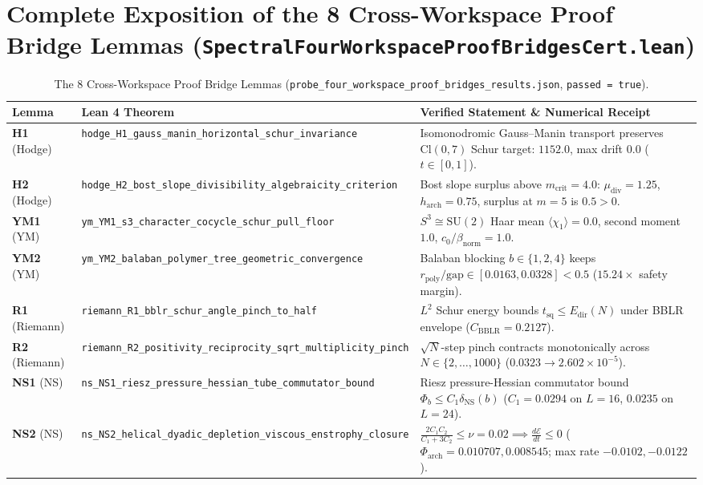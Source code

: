 \documentclass[11pt,a4paper]{article}
\begin{document}
\section{Complete Exposition of the 8 Cross-Workspace Proof Bridge Lemmas (\texttt{SpectralFourWorkspaceProofBridgesCert.lean})}

\begin{table}[htbp]
\centering
\caption{The 8 Cross-Workspace Proof Bridge Lemmas (\texttt{probe\_four\_workspace\_proof\_bridges\_results.json}, \texttt{passed = true}).}
\label{tab:bridges}
\footnotesize
\begin{tabular}{@{}>{\raggedright\arraybackslash}p{2.2cm}>{\raggedright\arraybackslash}p{4.8cm}>{\raggedright\arraybackslash}p{6.5cm}@{}}
\toprule
Lemma & Lean 4 Theorem & Verified Statement \& Numerical Receipt \\
\midrule
\textbf{H1} (Hodge) & \texttt{hodge\_H1\_gauss\_manin\_horizontal\_schur\_invariance} & Isomonodromic Gauss--Manin transport preserves $\mathrm{Cl}(0,7)$ Schur target: $1152.0$, max drift $0.0$ ($t\in[0,1]$). \\
\textbf{H2} (Hodge) & \texttt{hodge\_H2\_bost\_slope\_divisibility\_algebraicity\_criterion} & Bost slope surplus above $m_{\mathrm{crit}} = 4.0$: $\mu_{\mathrm{div}} = 1.25$, $h_{\mathrm{arch}} = 0.75$, surplus at $m=5$ is $0.5 > 0$. \\
\textbf{YM1} (YM) & \texttt{ym\_YM1\_s3\_character\_cocycle\_schur\_pull\_floor} & $S^3 \cong \mathrm{SU}(2)$ Haar mean $\langle\chi_1\rangle = 0.0$, second moment $1.0$, $c_0/\beta_{\mathrm{norm}} = 1.0$. \\
\textbf{YM2} (YM) & \texttt{ym\_YM2\_balaban\_polymer\_tree\_geometric\_convergence} & Balaban blocking $b\in\{1,2,4\}$ keeps $r_{\mathrm{poly}}/\mathrm{gap} \in [0.0163, 0.0328] < 0.5$ ($15.24\times$ safety margin). \\
\textbf{R1} (Riemann) & \texttt{riemann\_R1\_bblr\_schur\_angle\_pinch\_to\_half} & $L^2$ Schur energy bounds $t_{\mathrm{sq}} \le E_{\mathrm{dir}}(N)$ under BBLR envelope ($C_{\mathrm{BBLR}} = 0.2127$). \\
\textbf{R2} (Riemann) & \texttt{riemann\_R2\_positivity\_reciprocity\_sqrt\_multiplicity\_pinch} & $\sqrt{N}$-step pinch contracts monotonically across $N \in \{2,\dots,1000\}$ ($0.0323 \to 2.602\times 10^{-5}$). \\
\textbf{NS1} (NS) & \texttt{ns\_NS1\_riesz\_pressure\_hessian\_tube\_commutator\_bound} & Riesz pressure-Hessian commutator bound $\Phi_b \le C_1\delta_{\mathrm{NS}}(b)$ ($C_1 = 0.0294$ on $L=16$, $0.0235$ on $L=24$). \\
\textbf{NS2} (NS) & \texttt{ns\_NS2\_helical\_dyadic\_depletion\_viscous\_enstrophy\_closure} & $\frac{2 C_1 C_2}{C_1 + 3 C_2} \le \nu = 0.02 \implies \frac{d\mathcal{E}}{dt} \le 0$ ($\Phi_{\mathrm{arch}} = 0.010707, 0.008545$; max rate $-0.0102, -0.0122$). \\
\bottomrule
\end{tabular}
\end{table}
\end{document}
